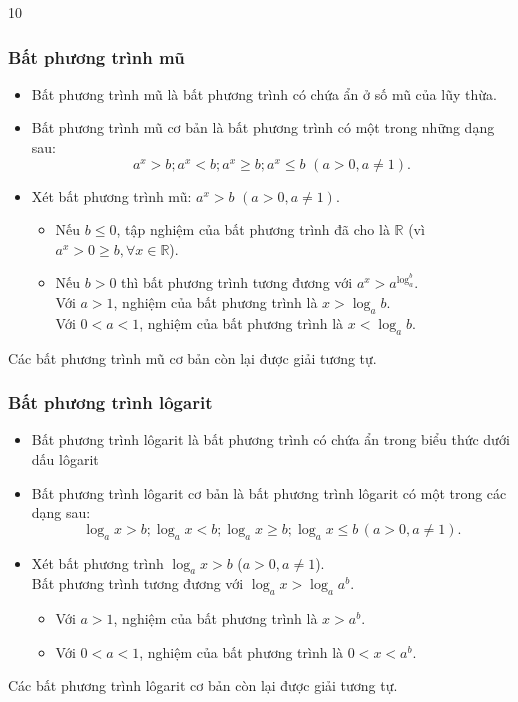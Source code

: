 \begin{indapan}{10}
\begin{tomtat}
	\subsubsection{Bất phương trình mũ}
	\begin{itemize}
		\item Bất phương trình mũ là bất phương trình có chứa ẩn ở số mũ của lũy thừa.
		\item Bất phương trình mũ cơ bản là bất phương trình có một trong những dạng sau:
		$$a^x>b; a^x<b; a^x\geq b; a^x \leq b\,\, (a>0,a\neq 1).$$
		\item Xét bất phương trình mũ: $a^x>b\, \, (a>0, a\neq 1)$.
		\begin{itemize}
			\item Nếu $b\leq 0$, tập nghiệm của bất phương trình đã cho là $\mathbb{R}$ (vì $a^x>0\geq b, \forall x\in \mathbb{R}$).
			\item Nếu $b>0$ thì bất phương trình tương đương với $a^x>a^{\log_a^b}$.\\
			Với $a>1$, nghiệm của bất phương trình là $x>\log_a b$.\\
			Với $0<a<1$, nghiệm của bất phương trình là $x<\log_a b$.
		\end{itemize}
	\end{itemize}
	\begin{nx}
		Các bất phương trình mũ cơ bản còn lại được giải tương tự.
	\end{nx}
	\subsubsection{Bất phương trình lôgarit}
	\begin{itemize}
		\item Bất phương trình lôgarit là bất phương trình có chứa ẩn trong biểu thức dưới dấu lôgarit
		\item Bất phương trình lôgarit cơ bản là bất phương trình lôgarit có một trong các dạng sau:
		$$\log_a x>b; \log_a x<b;\log_a x\geq b; \log_a x\leq b\, (a>0, a\neq 1).$$
		\item Xét bất phương trình $\log_ax>b$ ($a>0, a\neq 1$).\\
		Bất phương trình tương đương với $\log_a x>\log_a a^b$.
		\begin{itemize}
			\item Với $a>1$, nghiệm của bất phương trình là $x>a^b$.
			\item Với $0<a<1$, nghiệm của bất phương trình là $0<x<a^b$.
		\end{itemize}
	\end{itemize}
	\begin{nx}
		Các bất phương trình lôgarit cơ bản còn lại được giải tương tự.
	\end{nx}
\end{tomtat} \setcounter{subsubsection}{0}
\setcounter{ex}{0}
\setcounter{bt}{0}

\end{indapan}
